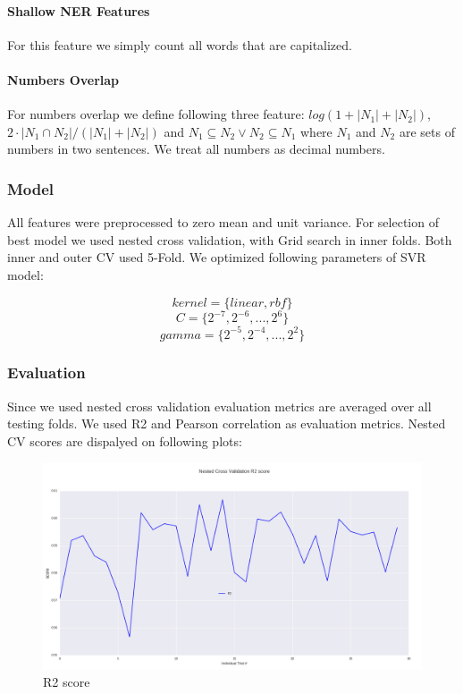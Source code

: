 \documentclass[10pt, a4paper]{article}
\begin{document}
\begin{table}[h!]
\paragraph{Shallow NER Features \\}
For this feature we simply count all words that are capitalized.
\paragraph{Numbers Overlap \\}
For numbers overlap we define following three feature: $log(1+|N_1|+|N_2|)$, $2\cdot|N_1 \cap N_2|/(|N_1|+|N_2|)$ and $N_1 \subseteq N_2 \vee N_2 \subseteq N_1$
where $N_1$ and $N_2$ are sets of numbers in two sentences. We treat all numbers as decimal numbers.

\subsubsection{Model}
All features were preprocessed to zero mean and unit variance. For selection of best model we used nested cross validation, with Grid search in inner folds. Both inner and outer CV used 5-Fold. We optimized following parameters of SVR model:

\[ kernel = \{ linear, rbf \} \]
\[ C = \{ 2^{-7},2^{-6}, ..., 2^6 \} \]
\[ gamma = \{ 2^{-5}, 2^{-4},..., 2^2 \} \]

\subsubsection{Evaluation}
Since we used nested cross validation evaluation metrics are averaged over all testing folds. We used R2 and Pearson correlation as evaluation metrics. Nested CV scores are dispalyed on following plots:


\begin{figure}[h!]
\begin{center}
	\centering
	\includegraphics[scale=0.36]{R2.png}
	\caption{R2 score}
\end{center}
\end{figure}



\end{table}
\end{document}
